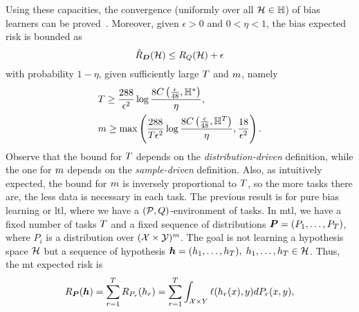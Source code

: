 Using these capacities, the convergence (uniformly over all $\mathcal{H} \in \mathbb{H}$) of bias learners can be proved~\cite[Theorem~2]{baxter2000model}. Moreover, given $\epsilon > 0$ and $0 < \eta < 1$, the bias expected risk is bounded as
\begin{equation}
    \nonumber
    \hat{R}_{\bm{D}}(\mathcal{H}) \leq R_Q(\mathcal{H}) + \epsilon
\end{equation}
with probability $1 - \eta$, given sufficiently large $T$ and $m$, namely
\begin{equation}
    \nonumber
    \begin{aligned}
        &T \geq \frac{288}{\epsilon^2} \log{\frac{8C\left(\frac{\epsilon}{48}, \mathbb{H}^{*}\right)}{\eta}} , \\
        &m \geq \max \left( \frac{288}{T \epsilon^2} \log\frac{8C\left(\frac{\epsilon}{48}, \mathbb{H}^{T}\right)}{\eta} , \frac{18}{\epsilon^2}\right) . 
    \end{aligned}
\end{equation}
Observe that the bound for $T$ depends on the \emph{distribution-driven} definition, while the one for $m$ depends on the \emph{sample-driven} definition.
Also, as intuitively expected, the bound for $m$ is inversely proportional to $T$, so the more tasks there are, the less data is necessary in each task. 
The previous result is for pure bias learning or \acrshort{ltl}, where we have a $(\mathcal{P}, Q)$-environment of tasks. In \acrshort{mtl}, we have a fixed number of tasks $T$ and a fixed sequence of distributions $\bm{P} = (P_1, \ldots, P_T)$, where $P_i$ is a distribution over $(\mathcal{X} \times \mathcal{Y})^m$. The goal is not learning a hypothesis space $\mathcal{H}$ but a sequence of hypothesis $\bm{h} = (h_1, \ldots, h_T),\; h_1, \ldots, h_T \in \mathcal{H} $. Thus, the \acrshort{mt} expected risk is
\begin{equation}\label{eq:mtlearn_exprisk}
    \risk_{\bprobseq}(\myvec{\hypf}) = \sum_{r=1}^\ntasks \risk_{P_r}(\hypf_r)  = \sum_{r=1}^\ntasks \int_{\Xspace \times Y} \lossf(\hypf_r(x), y) d{P_r}(x, y),
\end{equation}
